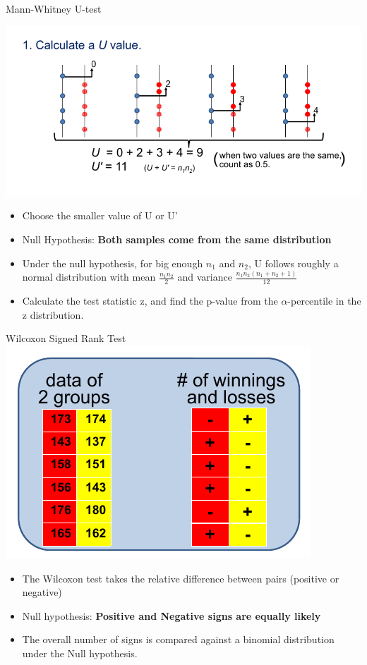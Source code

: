 \begin{frame}{Mann-Whitney U-test}{}
  \begin{center}
    \includegraphics[width=.5\textwidth]{../img/MannWhitneyU}
  \end{center}

  \begin{itemize}
    \item Choose the smaller value of U or U'
    \item Null Hypothesis: {\bf Both samples come from the same distribution}
    \item Under the null hypothesis, for big enough $n_1$ and $n_2$, U follows
    roughly a normal distribution with mean $\frac{n_1n_2}{2}$ and variance $\frac{n_1n_2(n_1+n_2+1)}{12}$
    \item Calculate the test statistic z, and find the p-value from the $\alpha$-percentile in the z distribution.
  \end{itemize}
\end{frame}

\begin{frame}{Wilcoxon Signed Rank Test}{}
  \includegraphics[width=.4\textwidth]{../img/SignTest}

  \begin{itemize}
    \item The Wilcoxon test takes the relative difference between pairs (positive or negative)
    \item Null hypothesis: {\bf Positive and Negative signs are equally likely}
    \item The overall number of signs is compared against a binomial distribution under the Null hypothesis.
  \end{itemize}
\end{frame}


